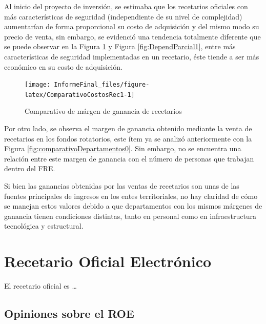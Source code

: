 \documentclass[
]{book}
\begin{document}
Al inicio del proyecto de inversión, se estimaba que los recetarios oficiales con más características de seguridad (independiente de su nivel de complejidad) aumentarían de forma proporcional su costo de adquisición y del mismo modo su precio de venta, sin embargo, se evidenció una tendencia totalmente diferente que se puede observar en la Figura \ref{fig:ComparativoCostosRec1} y Figura \ref{fig:DependParcial1}, entre más características de seguridad implementadas en un recetario, éste tiende a ser más económico en su costo de adquisición.

\begin{figure}

{\centering \texttt{[image: InformeFinal\_files/figure-latex/ComparativoCostosRec1-1]} 

}

\caption{Comparativo de márgen de ganancia de recetarios}\label{fig:ComparativoCostosRec1}
\end{figure}

Por otro lado, se observa el margen de ganancia obtenido mediante la venta de recetarios en los fondos rotatorios, este ítem ya se analizó anteriormente con la Figura \ref{fig:comparativoDepartamentos0}. Sin embargo, no se encuentra una relación entre este margen de ganancia con el número de personas que trabajan dentro del FRE.

Si bien las ganancias obtenidas por las ventas de recetarios son unas de las fuentes principales de ingresos en los entes territoriales, no hay claridad de cómo se manejan estos valores debido a que departamentos con los mismos márgenes de ganancia tienen condiciones distintas, tanto en personal como en infraestructura tecnológica y estructural.

\hypertarget{recetario-oficial-electruxf3nico}{%
\section{Recetario Oficial Electrónico}\label{recetario-oficial-electruxf3nico}}

El recetario oficial es \ldots{}

\hypertarget{opiniones-sobre-el-roe}{%
\subsection{Opiniones sobre el ROE}\label{opiniones-sobre-el-roe}}
\end{document}
